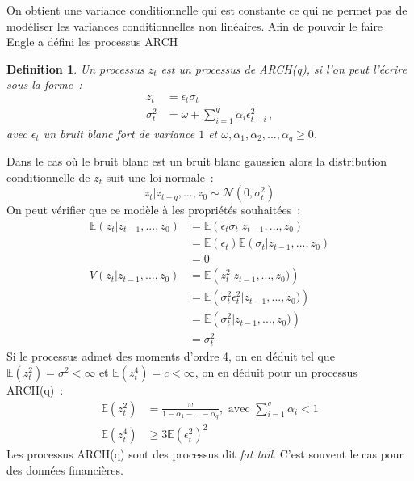 \documentclass[11pt]{scrartcl} %
\newtheorem{Def}[theorem]{Definition}
\newcommand{\E}[1]{\mathbb{E}\left(#1\right)}
\begin{document}
On obtient une variance conditionnelle qui est constante ce qui ne permet pas de modéliser les variances conditionnelles non linéaires. Afin de pouvoir le faire Engle \cite{archEngle} a défini les processus ARCH
\begin{Def}\label{archDef}
Un processus $z_t$ est un processus de ARCH(q), si l'on peut l'écrire sous la forme~:
\begin{align*}
z_t &= \epsilon_t\sigma_t\\
\sigma_t^2 &= \omega + \sum_{i=1}^q \alpha_i \epsilon_{t-i}^2\,,
\end{align*}
avec $\epsilon_t$ un bruit blanc fort de variance $1$ et $\omega,\alpha_1,\alpha_2,...,\alpha_q\geq 0$. 
\end{Def}
Dans le cas où le bruit blanc est un bruit blanc gaussien alors  la distribution conditionnelle de $z_t$ suit une loi normale~:
$$
z_t|z_{t-q},...,z_0\sim \mathcal{N}\left(0,\sigma_t^2\right)
$$
On peut vérifier que ce modèle à les propriétés souhaitées~:
\begin{align*}
\E{z_t|z_{t-1},...,z_0}&=\E{\epsilon_t\sigma_t|z_{t-1},...,z_0}\\
&=\E{\epsilon_t}\E{\sigma_t|z_{t-1},...,z_0}\\
&= 0\\
V(z_t|z_{t-1},...,z_0)&=\E{z_t^2|z_{t-1},...,z_0)}\\
&=\E{\sigma_t^2\epsilon_t^2|z_{t-1},...,z_0)}\\
&=\E{\sigma_t^2|z_{t-1},...,z_0)}\\
&= \sigma_t^2
\end{align*}
Si le processus admet des moments d'ordre 4, on en déduit tel que $\E{z_t^2}=\sigma^2<\infty$ et $\E{z_t^4}=c<\infty$, on en déduit pour un processus ARCH(q)~:
\begin{align*}
\E{z_t^2} &= \frac{\omega}{1-\alpha_1-...-\alpha_q},\textrm{ avec }\sum_{i=1}^q\alpha_i<1\\
\E{z_t^4}&\geq 3\E{\epsilon_t^2}^2
\end{align*}
Les processus ARCH(q) sont des processus dit \textit{fat tail}. C'est souvent le cas pour des données financières.
\end{document}
